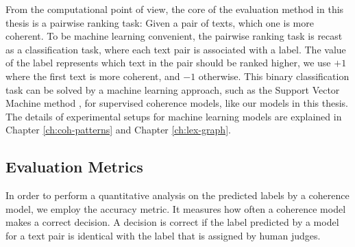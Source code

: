 From the computational point of view, the core of the evaluation method in this thesis is a pairwise ranking task: Given a pair of texts, which one is more coherent. 
To be machine learning convenient, the pairwise ranking task is recast as a classification task, where each text pair is associated with a label. 
The value of the label represents which text in the pair should be ranked higher, we use $+1$ where the first text is more coherent, and $-1$ otherwise. 
This binary classification task can be solved by a machine learning approach, such as the Support Vector Machine method \cite{}, for supervised coherence models, like our models in this thesis. 
The details of experimental setups for machine learning models are explained in Chapter \ref{ch:coh-patterns} and Chapter \ref{ch:lex-graph}.  

\subsection{Evaluation Metrics}

In order to perform a quantitative analysis on the predicted labels by a coherence model, we employ the accuracy metric. 
It measures how often a coherence model makes a correct decision. 
A decision is correct if the label predicted by a model for a text pair is identical with the label that is assigned by human judges. 











